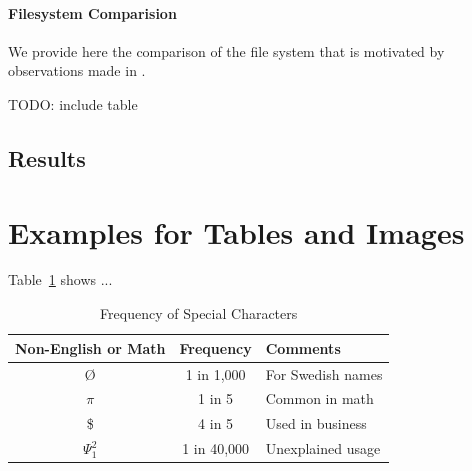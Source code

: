 \documentclass[sigplan,screen,review]{acmart}
\begin{document}
\paragraph{Filesystem Comparision}

We provide here the comparison of the file system that is motivated by observations made in \cite{???}.


TODO: include table



\subsection{Results}


\section{Examples for Tables and Images}

Table~\ref{tab:freq} shows ...

\begin{table}
  \caption{Frequency of Special Characters}
  \label{tab:freq}
  \begin{tabular}{ccl}
    \toprule
    Non-English or Math&Frequency&Comments\\
    \midrule
    \O & 1 in 1,000& For Swedish names\\
    $\pi$ & 1 in 5& Common in math\\
    \$ & 4 in 5 & Used in business\\
    $\Psi^2_1$ & 1 in 40,000& Unexplained usage\\
  \bottomrule
\end{tabular}
\end{table}
\end{document}
